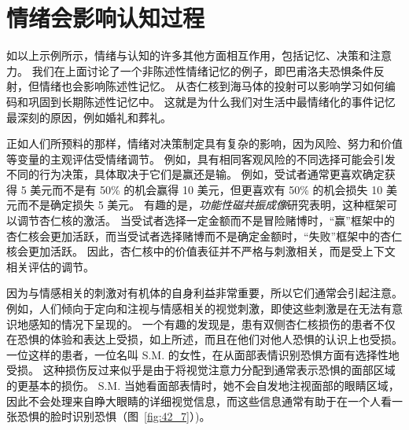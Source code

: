\section{情绪会影响认知过程}

如以上示例所示，情绪与认知的许多其他方面相互作用，包括记忆、决策和注意力。
我们在上面讨论了一个非陈述性情绪记忆的例子，即巴甫洛夫恐惧条件反射，但情绪也会影响陈述性记忆。
从杏仁核到海马体的投射可以影响学习如何编码和巩固到长期陈述性记忆中。
这就是为什么我们对生活中最情绪化的事件记忆最深刻的原因，例如婚礼和葬礼。


正如人们所预料的那样，情绪对决策制定具有复杂的影响，因为风险、努力和价值等变量的主观评估受情绪调节。
例如，具有相同客观风险的不同选择可能会引发不同的行为决策，具体取决于它们是赢还是输。
例如，受试者通常更喜欢确定获得 5 美元而不是有 50\% 的机会赢得 10 美元，但更喜欢有 50\% 的机会损失 10 美元而不是确定损失 5 美元。
有趣的是，\textit{功能性磁共振成像}研究表明，这种框架可以调节杏仁核的激活。
当受试者选择一定金额而不是冒险赌博时，“赢”框架中的杏仁核会更加活跃，而当受试者选择赌博而不是确定金额时，“失败”框架中的杏仁核会更加活跃。
因此，杏仁核中的价值表征并不严格与刺激相关，而是受上下文相关评估的调节。


因为与情感相关的刺激对有机体的自身利益非常重要，所以它们通常会引起注意。
例如，人们倾向于定向和注视与情感相关的视觉刺激，即使这些刺激是在无法有意识地感知的情况下呈现的。
一个有趣的发现是，患有双侧杏仁核损伤的患者不仅在恐惧的体验和表达上受损，如上所述，而且在他们对他人恐惧的认识上也受损。
一位这样的患者，一位名叫 S.M. 的女性，在从面部表情识别恐惧方面有选择性地受损。
这种损伤反过来似乎是由于将视觉注意力分配到通常表示恐惧的面部区域的更基本的损伤。
S.M. 当她看面部表情时，她不会自发地注视面部的眼睛区域，因此不会处理来自睁大眼睛的详细视觉信息，而这些信息通常有助于在一个人看一张恐惧的脸时识别恐惧（图~\ref{fig:42_7}）)。


